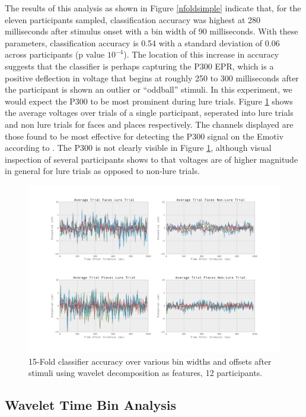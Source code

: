 \documentclass[12pt]{report}
\begin{document}
	The results of this analysis as shown in Figure \ref{nfoldsimple} indicate that, for the eleven participants sampled, classification accuracy was highest at 280 milliseconds after stimulus onset with a bin width of 90 milliseconds.  With these parameters, classification accuracy is 0.54 with a standard deviation of 0.06 across participants (p value $10^{-4}$).  The location of this increase in accuracy suggests that the classifier is perhaps capturing the P300 EPR, which is a positive deflection in voltage that begins at roughly 250 to 300 milliseconds after the participant is shown an outlier or ``oddball'' stimuli\cite{p300}.  In this experiment, we would expect the P300 to be most prominent during lure trials.  Figure \ref{luresvsnonlures300} shows the average voltages over trials of a single participant, seperated into lure trials and non lure trials for faces and places respectively.  The channels displayed are those found to be most effective for detecting the P300 signal on the Emotiv according to \cite{Ekanayake}.  The P300 is not clearly visible in Figure \ref{luresvsnonlures300}, although visual inspection of several participants shows to that voltages are of higher magnitude in general for lure trials as opposed to non-lure trials.  

     
\begin{figure}[t]
\centerline{
\includegraphics[width=7in]{lurevsnonlurep300}
}
\caption{15-Fold classifier accuracy over various bin widths and offsets after stimuli using wavelet decomposition as features, 12 participants.\label{luresvsnonlures300}}
\end{figure}

\subsection{Wavelet Time Bin Analysis}
\end{document}
